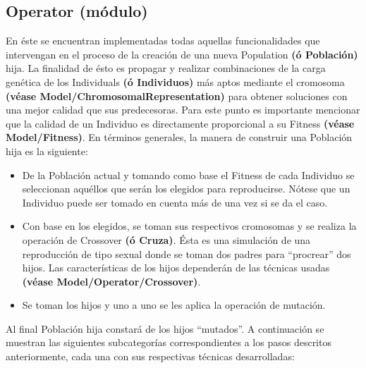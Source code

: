 \documentclass[class=report, crop=false]{standalone}
\begin{document}
\subsection{Operator (módulo)}
\label{sec:a_2_4}
En éste se encuentran implementadas todas aquellas funcionalidades 
que intervengan en el proceso de la creación de una nueva Population 
\textbf{(ó Población)} hija.\medskip\break
La finalidad de ésto es propagar y realizar combinaciones de la 
carga genética de los Individuals \textbf{(ó Individuos)} más aptos 
mediante el cromosoma \textbf{(véase Model/}\break\textbf{ChromosomalRepresentation)} 
para obtener soluciones con una mejor calidad que sus predecesoras.\medskip\break
Para este punto es importante mencionar que la calidad de un Individuo 
es directamente proporcional a su Fitness \textbf{(véase Model/Fitness)}.\medskip\break
En términos generales, la manera de construir una Población hija es 
la siguiente:

\begin{itemize}
\item De la Población actual y tomando como base el Fitness de cada Individuo se seleccionan aquéllos que serán los elegidos para reproducirse. Nótese que un Individuo puede ser tomado en cuenta más de una vez si se da el caso.
\item Con base en los elegidos, se toman sus respectivos cromosomas y se realiza la operación de Crossover \textbf{(ó Cruza)}. Ésta es una simulación de una reproducción de tipo sexual donde se toman dos padres para ``procrear'' dos hijos. \break Las características de los hijos dependerán de las técnicas usadas \textbf{(véase Model/}\break\textbf{Operator/Crossover)}.
\item Se toman los hijos y uno a uno se les aplica la operación de mutación.
\end{itemize}

Al final Población hija constará de los hijos ``mutados''.\medskip\break
A continuación se muestran las siguientes subcategorías correspondientes 
a los pasos descritos anteriormente, cada una con sus respectivas técnicas 
desarrolladas:

\end{document}
